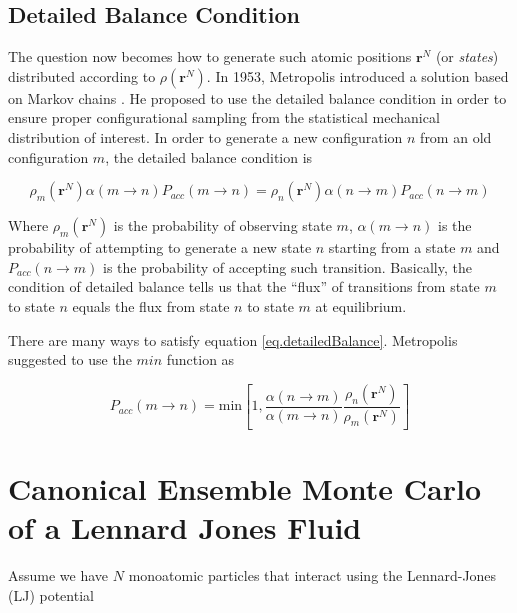 \documentclass[aip,jcp,preprint,superscriptaddress,floatfix]{revtex4-1}
\begin{document}
\subsection{Detailed Balance Condition}

The question now becomes how to generate such atomic positions $\textbf{r}^N$
(or \textit{states}) distributed
according to $\rho\left(\textbf{r}^N\right)$. In 1953, Metropolis introduced a
solution based on Markov chains
\cite{Metropolis.JCP.21.1087.1953}. 
He proposed to use the detailed balance
condition in order to ensure proper configurational sampling from
the statistical mechanical distribution of interest. In order to generate
a new configuration $n$ from an old configuration $m$,
the detailed balance condition is

\begin{equation}
	\rho_m\left(\textbf{r}^N\right) \alpha \left(m \rightarrow n \right)
	P_{acc} \left(m \rightarrow n \right) =
	\rho_n\left(\textbf{r}^N\right) \alpha \left(n \rightarrow m \right)
	P_{acc} \left(n \rightarrow m \right) 
	   \label{eq.detailedBalance}
\end{equation}

Where $\rho_m\left(\textbf{r}^N\right)$ is the probability of observing
state $m$,
$\alpha \left(m \rightarrow n \right)$ is the probability of
attempting to generate a new state $n$ starting from a state $m$  and 
$P_{acc} \left(n \rightarrow m \right)$ is the probability of accepting 
such transition. Basically, the condition of detailed balance tells us that the
``flux'' of transitions
from state $m$ to state $n$ equals the flux from state $n$ to state $m$ at
equilibrium.

There are many ways to satisfy equation \ref{eq.detailedBalance}. Metropolis suggested to use
the $min$ function as

\begin{equation}
	P_{acc}(m \rightarrow n) = \text{min} \left[1,\frac{\alpha \left(n
		\rightarrow m \right)}{\alpha \left(m \rightarrow n \right)}
		\frac{\rho_n\left(\textbf{r}^N\right)}{\rho_m\left(\textbf{r}^N\right)}
	\right]
	\label{eq.detailedBalanceFinal}
\end{equation}


\section{Canonical Ensemble Monte Carlo of a Lennard Jones Fluid}

Assume we have $N$ monoatomic particles that interact using the Lennard-Jones
(LJ)
potential
\end{document}
